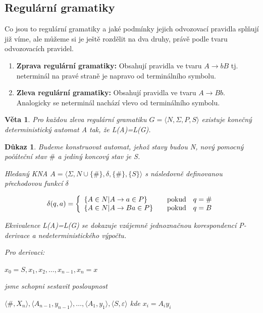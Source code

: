 \documentclass[10pt, a4paper, titlepage]{article}
\theoremstyle{note}
\newtheorem{veta}{\textbf{Věta}}
\newtheorem{dukaz}{\textbf{Důkaz}}
\begin{document}
\subsection{Regulární gramatiky}

Co jsou to regulární gramatiky a jaké podmínky jejich odvozovací pravidla splňují již víme, ale můžeme si je ještě rozdělit na dva druhy, právě podle tvaru odvozovacích pravidel.

\begin{enumerate}

\item
\textbf{Zprava regulární gramatiky:}
Obsahují pravidla ve tvaru $ A \rightarrow bB $ tj. neterminál na pravé straně je napravo od terminálního symbolu.
\item
\textbf{Zleva regulární gramatiky:}
Obsahují pravidla ve tvaru $ A \rightarrow Bb $. Analogicky se neterminál nachází vlevo od terminálního symbolu.
\end{enumerate}

\begin{veta}
Pro každou zleva regulární gramatiku $ G = \langle N,\Sigma,P,S \rangle $ existuje konečný deterministický automat \textit{A} tak, že \textit{L(A)=L(G)}.
\end{veta}

\begin{dukaz}
Budeme konstruovat automat, jehož stavy budou \textit{N}, nový pomocný počáteční stav $ \# $ a jediný koncový stav je \textit{S}.

Hledaný KNA $ A = \langle \Sigma,N \cup \lbrace \# \rbrace,\delta,\lbrace \# \rbrace,\lbrace S \rbrace \rangle$ s následovně definovanou přechodovou funkcí $\delta$

$$
\delta(q,a)=\left\{
\begin{array}{l@{\quad\mbox{}\quad}l}
\lbrace A \in N | A \rightarrow a \in P \rbrace & \text{pokud}\quad q=\#\\
\lbrace A \in N | A \rightarrow Ba \in P \rbrace & \text{pokud}\quad q=B\\
\end{array}
\right.
$$ 

Ekvivalence \textit{L(A)=L(G)} se dokazuje vzájemně jednoznačnou korespondencí P-derivace a nedeterministického výpočtu.

Pro derivaci:

$ x_0=S,x_1,x_2,\ldots,x_{n-1},x_n=x $

jsme schopni sestavit posloupnost

$ \langle \# , X_n \rangle,\langle A_{n-1} , y_{n-1} \rangle,\ldots,\langle A_1 , y_1 \rangle,\langle S , \varepsilon \rangle $ kde $x_i=A_{i}y_{i}$
\end{dukaz}
\end{document}

